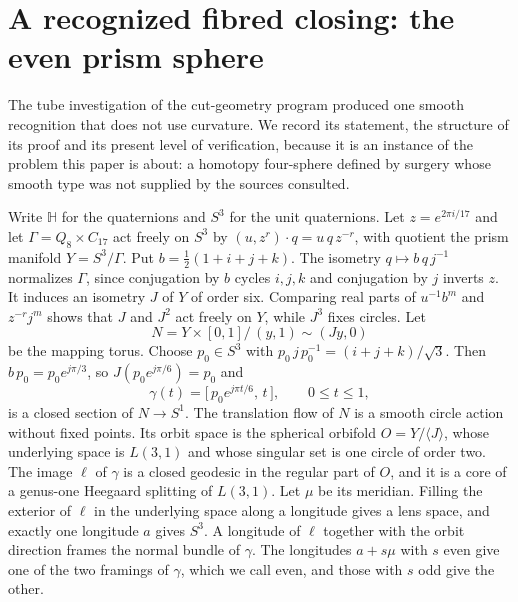 \section{A recognized fibred closing: the even prism sphere}\label{sec:prism}

The tube investigation of the cut-geometry program produced one smooth
recognition that does not use curvature. We record its statement, the
structure of its proof and its present level of verification, because it
is an instance of the problem this paper is about: a homotopy four-sphere
defined by surgery whose smooth type was not supplied by the sources
consulted.

Write \(\mathbb H\) for the quaternions and \(S^3\) for the unit
quaternions. Let \(z=e^{2\pi i/17}\) and let
\(\Gamma=Q_8\times C_{17}\) act freely on \(S^3\) by
\((u,z^r)\cdot q=u\,q\,z^{-r}\), with quotient the prism manifold
\(Y=S^3/\Gamma\). Put \(b=\tfrac12(1+i+j+k)\). The isometry
\(q\mapsto b\,q\,j^{-1}\) normalizes \(\Gamma\), since conjugation by
\(b\) cycles \(i,j,k\) and conjugation by \(j\) inverts \(z\). It induces
an isometry \(J\) of \(Y\) of order six. Comparing real parts of
\(u^{-1}b^m\) and \(z^{-r}j^m\) shows that \(J\) and \(J^2\) act freely
on \(Y\), while \(J^3\) fixes circles. Let
\[
 N=Y\times[0,1]\big/\,(y,1)\sim(Jy,0)
\]
be the mapping torus. Choose \(p_0\in S^3\) with
\(p_0\,j\,p_0^{-1}=(i+j+k)/\sqrt3\). Then
\(b\,p_0=p_0e^{j\pi/3}\), so \(J(p_0e^{j\pi/6})=p_0\) and
\[
 \gamma(t)=\bigl[\,p_0e^{j\pi t/6},\,t\,\bigr],\qquad 0\le t\le1,
\]
is a closed section of \(N\to S^1\). The translation flow of \(N\) is a
smooth circle action without fixed points. Its orbit space is the
spherical orbifold \(O=Y/\langle J\rangle\), whose underlying space is
\(L(3,1)\) and whose singular set is one circle of order two. The image
\(\ell\) of \(\gamma\) is a closed geodesic in the regular part of
\(O\), and it is a core of a genus-one Heegaard splitting of
\(L(3,1)\). Let \(\mu\) be its meridian. Filling the exterior of
\(\ell\) in the underlying space along a longitude gives a lens space,
and exactly one longitude \(a\) gives \(S^3\). A longitude of \(\ell\)
together with the orbit direction frames the normal bundle of
\(\gamma\). The longitudes \(a+s\mu\) with \(s\) even give one of the two
framings of \(\gamma\), which we call even, and those with \(s\) odd give
the other.


